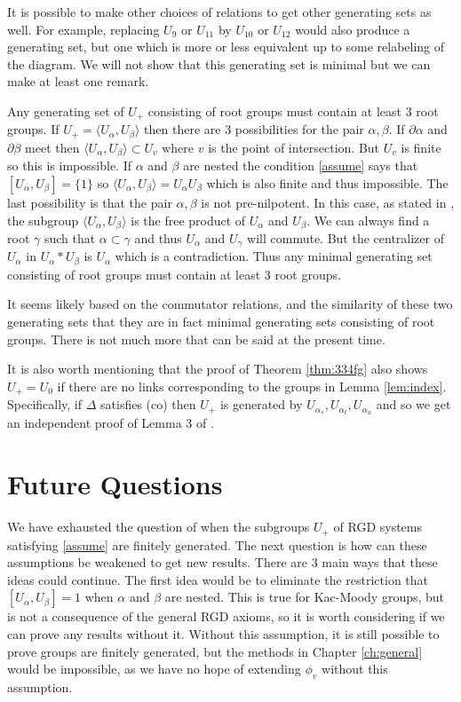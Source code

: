 \documentclass[class=book, crop=false]{standalone}
\begin{document}
It is possible to make other choices of relations to get other generating sets as well. For example, replacing $U_9$ or $U_{11}$ by $U_{10}$ or $U_{12}$ would also produce a generating set, but one which is more or less equivalent up to some relabeling of the diagram. We will not show that this generating set is minimal but we can make at least one remark.

Any generating set of $U_+$ consisting of root groups must contain at least 3 root groups. If $U_+=\langle U_\alpha,U_\beta\rangle$ then there are 3 possibilities for the pair $\alpha,\beta.$ If $\partial\alpha$ and $\partial\beta$ meet then $\langle U_\alpha,U_\beta\rangle\subset U_v$ where $v$ is the point of intersection. But $U_v$ is finite so this is impossible. If $\alpha$ and $\beta$ are nested the condition \eqref{assume} says that $[U_\alpha,U_\beta]=\{1\}$ so $\langle U_\alpha,U_\beta\rangle=U_\alpha U_\beta$ which is also finite and thus impossible. The last possibility is that the pair $\alpha,\beta$ is not pre-nilpotent. In this case, as stated in \cite{free}, the subgroup $\langle U_\alpha,U_\beta\rangle$ is the free product of $U_\alpha$ and $U_\beta.$ We can always find a root $\gamma$ such that $\alpha\subset \gamma$ and thus $U_\alpha$ and $U_\gamma$ will commute. But the centralizer of $U_\alpha$ in $U_\alpha\ast U_\beta$ is $U_\alpha$ which is a contradiction. Thus any minimal generating set consisting of root groups must contain at least 3 root groups. 

It seems likely based on the commutator relations, and the similarity of these two generating sets that they are in fact minimal generating sets consisting of root groups. There is not much more that can be said at the present time.

It is also worth mentioning that the proof of Theorem \ref{thm:334fg} also shows $U_+=U_0$ if there are no links corresponding to the groups in Lemma \ref{lem:index}. Specifically, if $\Delta$ satisfies (co) then $U_+$ is generated by $U_{\alpha_s},U_{\alpha_t},U_{\alpha_u}$ and so we get an independent proof of Lemma 3 of \cite{cop}.

\clearpage
\section{Future Questions}
We have exhausted the question of when the subgroups $U_+$ of RGD systems satisfying \eqref{assume} are finitely generated. The next question is how can these assumptions be weakened to get new results. There are 3 main ways that these ideas could continue. The first idea would be to eliminate the restriction that $[U_\alpha,U_\beta]=1$ when $\alpha$ and $\beta$ are nested. This is true for Kac-Moody groups, but is not a consequence of the general RGD axioms, so it is worth considering if we can prove any results without it. Without this assumption, it is still possible to prove groups are finitely generated, but the methods in Chapter \ref{ch:general} would be impossible, as we have no hope of extending $\phi_v$ without this assumption.
\end{document}
